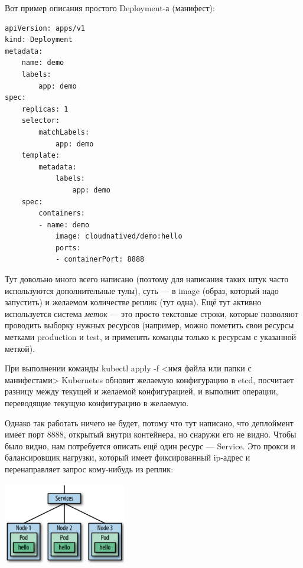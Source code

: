 \documentclass{../text-style}
\begin{document}
Вот пример описания простого Deployment-а (манифест):

\begin{verbatim}
apiVersion: apps/v1
kind: Deployment
metadata:
    name: demo
    labels:
        app: demo
spec:
    replicas: 1
    selector:
        matchLabels:
            app: demo
    template:
        metadata:
            labels:
                app: demo
    spec:
        containers:
        - name: demo
            image: cloudnatived/demo:hello
            ports:
            - containerPort: 8888
\end{verbatim}


Тут довольно много всего написано (поэтому для написания таких штук часто используются дополнительные тулы), суть --- в image (образ, который надо запустить) и желаемом количестве реплик (тут одна). Ещё тут активно используется система \emph{меток} --- это просто текстовые строки, которые позволяют проводить выборку нужных ресурсов (например, можно пометить свои ресурсы метками production и test, и применять команды только к ресурсам с указанной меткой).

При выполнении команды kubectl apply -f <имя файла или папки с манифестами> Kubernetes обновит желаемую конфигурацию в etcd, посчитает разницу между текущей и желаемой конфигурацией, и выполнит операции, переводящие текущую конфигурацию в желаемую.

Однако так работать ничего не будет, потому что тут написано, что деплоймент имеет порт 8888, открытый внутри контейнера, но снаружи его не видно. Чтобы было видно, нам потребуется описать ещё один ресурс --- Service. Это прокси и балансировщик нагрузки, который имеет фиксированный ip-адрес и перенаправляет запрос кому-нибудь из реплик:

\begin{center}
    \includegraphics[width=0.4\textwidth]{kubernetesServices.png}
\end{center}
\end{document}
